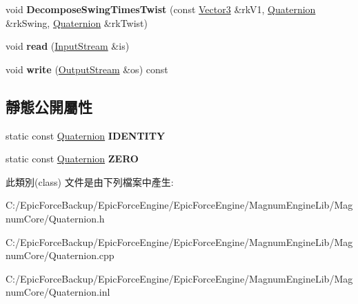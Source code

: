 \begin{DoxyCompactItemize}
\item 
void {\bfseries Decompose\+Swing\+Times\+Twist} (const \hyperlink{class_magnum_1_1_vector3}{Vector3} \&rk\+V1, \hyperlink{class_magnum_1_1_quaternion}{Quaternion} \&rk\+Swing, \hyperlink{class_magnum_1_1_quaternion}{Quaternion} \&rk\+Twist)\hypertarget{class_magnum_1_1_quaternion_ae20aebbc09cd6379352503e69c85b43e}{}\label{class_magnum_1_1_quaternion_ae20aebbc09cd6379352503e69c85b43e}

\item 
void {\bfseries read} (\hyperlink{class_magnum_1_1_input_stream}{Input\+Stream} \&is)\hypertarget{class_magnum_1_1_quaternion_afdd69d6f15b7a2115f2dfe57e009380c}{}\label{class_magnum_1_1_quaternion_afdd69d6f15b7a2115f2dfe57e009380c}

\item 
void {\bfseries write} (\hyperlink{class_magnum_1_1_output_stream}{Output\+Stream} \&os) const \hypertarget{class_magnum_1_1_quaternion_ac3516707277a0c53ca03ce906a523b18}{}\label{class_magnum_1_1_quaternion_ac3516707277a0c53ca03ce906a523b18}

\end{DoxyCompactItemize}
\subsection*{靜態公開屬性}
\begin{DoxyCompactItemize}
\item 
static const \hyperlink{class_magnum_1_1_quaternion}{Quaternion} {\bfseries I\+D\+E\+N\+T\+I\+TY}\hypertarget{class_magnum_1_1_quaternion_ac18490f3704b16fef9c789167913e7a8}{}\label{class_magnum_1_1_quaternion_ac18490f3704b16fef9c789167913e7a8}

\item 
static const \hyperlink{class_magnum_1_1_quaternion}{Quaternion} {\bfseries Z\+E\+RO}\hypertarget{class_magnum_1_1_quaternion_a0bee05cefbc622f8d1f72d3f06a187ed}{}\label{class_magnum_1_1_quaternion_a0bee05cefbc622f8d1f72d3f06a187ed}

\end{DoxyCompactItemize}


此類別(class) 文件是由下列檔案中產生\+:\begin{DoxyCompactItemize}
\item 
C\+:/\+Epic\+Force\+Backup/\+Epic\+Force\+Engine/\+Epic\+Force\+Engine/\+Magnum\+Engine\+Lib/\+Magnum\+Core/Quaternion.\+h\item 
C\+:/\+Epic\+Force\+Backup/\+Epic\+Force\+Engine/\+Epic\+Force\+Engine/\+Magnum\+Engine\+Lib/\+Magnum\+Core/Quaternion.\+cpp\item 
C\+:/\+Epic\+Force\+Backup/\+Epic\+Force\+Engine/\+Epic\+Force\+Engine/\+Magnum\+Engine\+Lib/\+Magnum\+Core/Quaternion.\+inl\end{DoxyCompactItemize}
